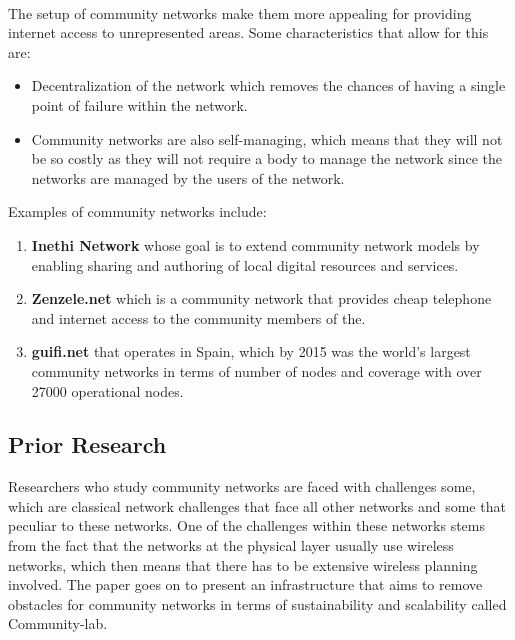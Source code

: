 \paragraph{}The setup of community networks make them more appealing for providing internet access to unrepresented areas.
Some characteristics that allow for this are:
\begin{itemize}
    \item  Decentralization of the network\cite{Selimi:2014:TAD:2723218.2723265} which removes the chances of having a single point of failure within the network.
    \item Community networks are also self-managing\cite{Braem:2013:CRC:2500098.2500108}, which means that they will not be so costly as they will not require a body to manage the network since the networks are managed by the users of the network.
\end{itemize}
Examples of community networks include:
\begin{enumerate}
    \item \textbf{Inethi Network} whose goal is to extend community network models by enabling sharing and authoring of local digital resources and services\cite{inethi_technologies}.
    \item \textbf{Zenzele.net} which is a community network that provides cheap telephone and internet access to the community members of the\cite{zenzeleni.net}.
    \item \textbf{guifi.net} that operates in Spain\cite{guifi}, which by 2015 was the world's largest community networks in terms of number of nodes and coverage with over 27000 operational nodes\cite{2015:TOG:2852375.2852741}.
\end{enumerate}

\subsection{Prior Research}\label{subsec:prior-research}
Researchers who study community networks are faced with challenges some, which are classical network challenges that face all other networks and some that peculiar to these networks\cite{Braem:2013:CRC:2500098.2500108}.
One of the challenges within these networks stems from the fact that the networks at the physical layer usually use wireless networks, which then means that there has to be extensive wireless planning involved\cite{Braem:2013:CRC:2500098.2500108}.
The paper goes on to present an infrastructure that aims to remove obstacles for community networks in terms of sustainability and scalability called Community-lab\cite{Braem:2013:CRC:2500098.2500108}.
